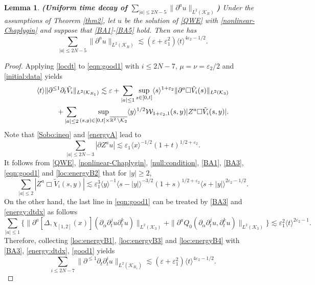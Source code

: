 \documentclass[11pt,twoside]{article}
\def\cK{\mathcal K}
\def\cW{\mathcal W}
\def\R{\mathop{\mathbb R\kern 0pt}\nolimits}
\def\ds{\displaystyle}
\def\p{\partial}
\def\ve{\varepsilon}
\def\ls{\lesssim}
\newcommand{\w}[1]{\langle {#1} \rangle}
\theoremstyle{plain}
\newtheorem{lemma}[theorem]{Lemma}
\theoremstyle{definition}
\numberwithin{equation}{section}
\begin{document}
\begin{lemma}
{\bf (Uniform time decay of $\ds\sum_{|a|\le2N-5}\|\p^au\|_{L^2(\cK_R)}$)}
Under the assumptions of Theorem \ref{thm2}, let $u$ be the solution of \eqref{QWE} with \eqref{nonlinear-Chaplygin} and suppose that \eqref{BA1}-\eqref{BA5} hold.
Then one has
\begin{equation}\label{loc:energyB}
\sum_{|a|\le2N-5}\|\p^au\|_{L^2(\cK_R)}\ls(\ve+\ve_1^2)\w{t}^{4\ve_2-1/2}.
\end{equation}
\end{lemma}
\begin{proof}
Applying \eqref{locdt} to \eqref{eqn:good1} with $i\le2N-7$, $\mu=\nu=\ve_2/2$ and \eqref{initial:data} yields
\begin{equation}\label{loc:energyB1}
\begin{split}
\w{t}\|\p^{\le1}\p_t\tilde V_i\|_{L^2(\cK_{R_1})}\ls\ve+\sum_{|a|\le1}\sup_{s\in[0,t]}\w{s}^{1+\ve_2}\|\p^a\Box\tilde V_i(s)\|_{L^2(\cK_3)}\\
+\sum_{|a|\le2}\sup_{(s,y)\in[0,t]\times\overline{\R^2\setminus\cK_2}}\w{y}^{1/2}\cW_{1+\ve_2,1}(s,y)|Z^a\Box\tilde V_i(s,y)|.
\end{split}
\end{equation}
Note that \eqref{Sobo:ineq} and \eqref{energyA} lead to
\begin{equation}\label{loc:energyB2}
\sum_{|a|\le2N-3}|\p Z^au|\ls\ve_1\w{x}^{-1/2}(1+t)^{1/2+\ve_2}.
\end{equation}
It follows from \eqref{QWE}, \eqref{nonlinear-Chaplygin}, \eqref{null:condition}, \eqref{BA1}, \eqref{BA3}, \eqref{eqn:good1}
and \eqref{loc:energyB2} that for $|y|\ge2$,
\begin{equation}\label{loc:energyB3}
\sum_{|a|\le2}|Z^a\Box\tilde V_i(s,y)|\ls\ve_1^3\w{y}^{-1}\w{s-|y|}^{-3/2}(1+s)^{1/2+\ve_2}\w{s+|y|}^{2\ve_2-1/2}.
\end{equation}
On the other hand, the last line in \eqref{eqn:good1} can be treated by \eqref{BA3} and \eqref{energy:dtdx} as follows
\begin{equation}\label{loc:energyB4}
\sum_{|a|\le1}\{\|\p^a[\Delta,\chi_{[1,2]}(x)](\p_{\alpha}\p_t^ju\p_t^ku)\|_{L^2(\cK_3)}+\|\p^aQ_0(\p_{\alpha}\p_t^ju,\p_t^ku)\|_{L^2(\cK_3)}\}
\ls\ve_1^2\w{t}^{2\ve_2-1}.
\end{equation}
Therefore, collecting \eqref{loc:energyB1}, \eqref{loc:energyB3} and \eqref{loc:energyB4} with \eqref{BA3}, \eqref{energy:dtdx}, \eqref{good1} yields
\begin{equation}\label{loc:energyB5}
\sum_{i\le2N-7}\|\p^{\le1}\p_t\p_t^iu\|_{L^2(\cK_{R_1})}\ls(\ve+\ve_1^2)\w{t}^{4\ve_2-1/2}.

\end{equation}
\end{proof}
\end{document}
